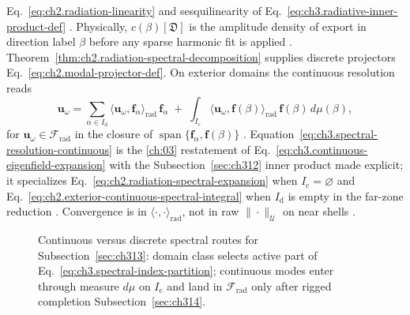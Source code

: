 Eq.~\eqref{eq:ch2.radiation-linearity} and sesquilinearity of
Eq.~\eqref{eq:ch3.radiative-inner-product-def} \cite{stratton1941}. Physically,
\(c(\beta)[\mathfrak{D}]\) is the amplitude density of export in direction label \(\beta\) before
any sparse harmonic fit is applied \cite{jackson1999}.
Theorem~\ref{thm:ch2.radiation-spectral-decomposition} supplies discrete projectors
Eq.~\eqref{eq:ch2.modal-projector-def}. On exterior domains the continuous resolution reads
\begin{equation}
\label{eq:ch3.spectral-resolution-continuous}
\mathbf{u}_\omega
=
\sum_{\alpha\in I_{\mathrm{d}}}
\big\langle \mathbf{u}_\omega,\mathbf{f}_\alpha\big\rangle_{\mathrm{rad}}\,\mathbf{f}_\alpha
\;+\;
\int_{I_{\mathrm{c}}}
\big\langle \mathbf{u}_\omega,\mathbf{f}(\beta)\big\rangle_{\mathrm{rad}}\,
\mathbf{f}(\beta)\,d\mu(\beta),
\end{equation}
for \(\mathbf{u}_\omega\in\mathcal{F}_{\mathrm{rad}}\) in the closure of
\(\operatorname{span}\{\mathbf{f}_\alpha,\mathbf{f}(\beta)\}\) \cite{stratton1941}.
Equation~\eqref{eq:ch3.spectral-resolution-continuous} is the \ref{ch:03} restatement of
Eq.~\eqref{eq:ch3.continuous-eigenfield-expansion} with the Subsection~\ref{sec:ch312} inner product
made explicit; it specializes Eq.~\eqref{eq:ch2.radiation-spectral-expansion} when
\(I_{\mathrm{c}}=\varnothing\) and Eq.~\eqref{eq:ch2.exterior-continuous-spectral-integral} when
\(I_{\mathrm{d}}\) is empty in the far-zone reduction \cite{stratton1941}. Convergence
is in \(\langle\cdot,\cdot\rangle_{\mathrm{rad}}\), not in raw \(\|\cdot\|_{\mathcal{U}}\) on near
shells \cite{harrington2001}.
\begin{figure}[t]
\centering
{}
\caption{Continuous versus discrete spectral routes for Subsection~\ref{sec:ch313}: domain class
selects active part of Eq.~\eqref{eq:ch3.spectral-index-partition}; continuous modes enter through
measure \(d\mu\) on \(I_{\mathrm{c}}\) and land in \(\mathcal{F}_{\mathrm{rad}}\) only after
rigged completion Subsection~\ref{sec:ch314}.}
\label{fig:ch3.continuous-discrete-spectral-split}
\end{figure}

